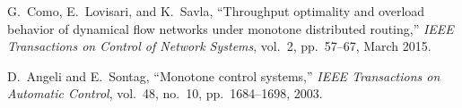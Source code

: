 \documentclass[letterpaper, 10 pt, conference]{ieeeconf}
\begin{document}
\begin{thebibliography}{10}
G.~Como, E.~Lovisari, and K.~Savla, ``Throughput optimality and overload
  behavior of dynamical flow networks under monotone distributed routing,''
  {\em IEEE Transactions on Control of Network Systems}, vol.~2, pp.~57--67,
  March 2015.

D.~Angeli and E.~Sontag, ``Monotone control systems,'' {\em IEEE Transactions
  on Automatic Control}, vol.~48, no.~10, pp.~1684--1698, 2003.

\end{thebibliography}
 
\end{document}
